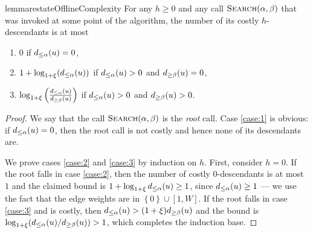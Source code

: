 \documentclass[11pt,letterpaper]{article}
\theoremstyle{plain}
\newcommand{\set}[1]{\left\lbrace #1 \right\rbrace}
\begin{document}
\begin{restatable}[]{lemma}{restateOfflineComplexity}
	For any $h \ge 0$ and any call $\textproc{Search}(\alpha, \beta)$ that was invoked at some point of the algorithm, the number of its costly $h$-descendants is at most
  \begin{enumerate}[label=${\arabic*}^\circ)$,ref=${\arabic*}^\circ$]
		\item $0$ if $d_{\le\alpha}(u) = 0$, \label{case:1}
    \item $1 + \log_{1 + \xi}(d_{\le\alpha}(u))$ if $d_{\le\alpha}(u) > 0$ and $d_{\ge\beta}(u) = 0$, \label{case:2}
    \item $\log_{1 + \xi}\left(\frac{d_{\le\alpha}(u)}{d_{\ge\beta}(u)}\right)$ if $d_{\le\alpha}(u) > 0$ and $d_{\ge\beta}(u) > 0$. \label{case:3}
	\end{enumerate}
\end{restatable}
\begin{proof}
	\newcommand{\CASE}[1]{\ref{case:#1}}
	We say that the call $\textproc{Search}(\alpha, \beta)$ is the \emph{root} call.
	Case \CASE{1} is obvious: if $d_{\le\alpha}(u) = 0$, then the root call is not costly and hence none of its descendants are.

	We prove cases \CASE{2} and \CASE{3} by induction on $h$.
	First, consider $h = 0$.
	If the root falls in case \CASE{2}, then the number of costly $0$-descendants is at most $1$ and the claimed bound is $1 + \log_{1 + \xi} d_{\le\alpha}(u) \ge 1$, since $d_{\le\alpha}(u) \ge 1$ --- we use the fact that the edge weights are in $\set{0} \cup [1, W]$.
	If the root falls in case \CASE{3} and is costly, then $d_{\le\alpha}(u) > (1 + \xi)d_{\ge\beta}(u)$ and the bound is $\log_{1 + \xi} ( d_{\le\alpha}(u)/ d_{\ge\beta}(u)) > 1$, which completes the induction base.


\end{proof}
\end{document}
